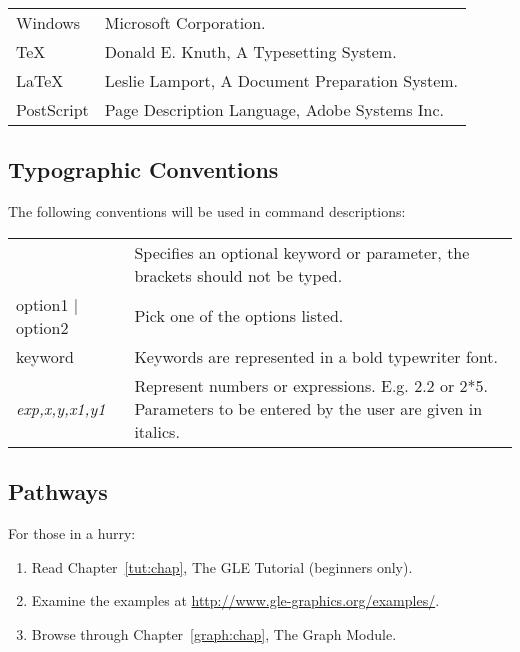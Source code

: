 \begin{tabular}{ll} %
{Windows}	& Microsoft Corporation.\\
{\TeX}		& Donald E. Knuth, A Typesetting System.\\
{\LaTeX}	& Leslie Lamport, A Document Preparation System.\\
{PostScript}	& Page Description Language, Adobe Systems Inc.\\
\end{tabular}

\subsection*{Typographic Conventions}

The following conventions will be used in command descriptions:

\begin{tabular}{lp{10cm}}
{\sf [option]} &  Specifies an optional keyword or parameter, the brackets
	should not be typed.\\
{\sf option1 $\mid$ option2} &
	Pick one of the options listed.\\
 {\sf keyword} &
	Keywords are represented in a bold typewriter font.\\
{\it exp,x,y,x1,y1} &
  	Represent numbers or expressions.  E.g. 2.2 or 2*5.
	Parameters to be entered by the user are given in italics.
\end{tabular}

\subsection*{Pathways}

For those in a hurry:
\begin{enumerate}
 \item		Read Chapter~\ref{tut:chap}, The GLE Tutorial (beginners only).
 \item		Examine the examples at \url{http://www.gle-graphics.org/examples/}.
 \item		Browse through Chapter~\ref{graph:chap}, The Graph Module.
\end{enumerate}
	
